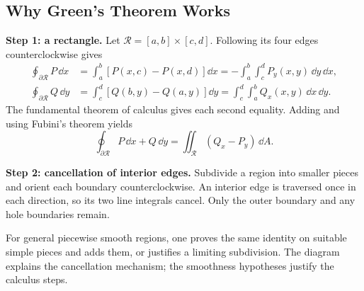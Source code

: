 \newpage
\subsection{Why Green's Theorem Works}

\textbf{Step 1: a rectangle.}
Let $\mathcal{R} = [a,b] \times [c,d]$. Following its four edges counterclockwise gives
\begin{align*}
    \oint_{\partial\mathcal{R}} P\,\dd{x}
    &= \int_a^b\left[P(x,c) - P(x,d)\right]\dd{x}
     = -\int_a^b\!\int_c^d P_y(x,y)\,\dd{y}\,\dd{x},\\
    \oint_{\partial\mathcal{R}} Q\,\dd{y}
    &= \int_c^d\left[Q(b,y) - Q(a,y)\right]\dd{y}
     = \int_c^d\!\int_a^b Q_x(x,y)\,\dd{x}\,\dd{y}.
\end{align*}
The fundamental theorem of calculus gives each second equality. Adding and using Fubini's theorem yields
\[
    \oint_{\partial\mathcal{R}}P\,\dd{x} + Q\,\dd{y}
    = \iint_{\mathcal{R}}(Q_x - P_y)\,\dd{A}.
\]

\textbf{Step 2: cancellation of interior edges.}
Subdivide a region into smaller pieces and orient each boundary counterclockwise. An interior edge is traversed once in each direction, so its two line integrals cancel. Only the outer boundary and any hole boundaries remain.

\begin{center}
\end{center}

For general piecewise smooth regions, one proves the same identity on suitable simple pieces and adds them, or justifies a limiting subdivision. The diagram explains the cancellation mechanism; the smoothness hypotheses justify the calculus steps.

